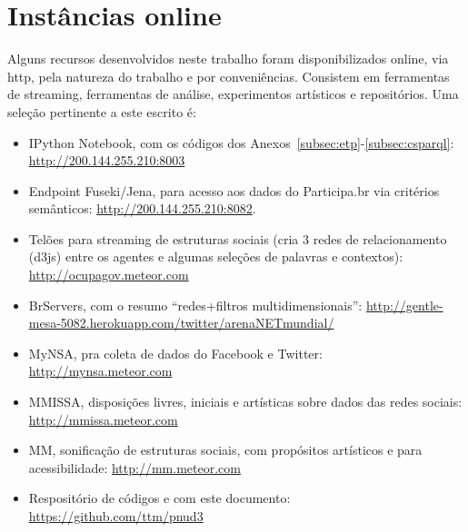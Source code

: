\documentclass[12pt]{article}
\begin{document}
%


\label{subsec:etp}

\label{subsec:srl}

\label{subsec:intAm}
\label{subsec:rkRd}

\label{subsec:setCon}
\label{subsec:com}
\label{subsec:misto}

\label{subsec:csparql}

\section{Instâncias online}\label{subsec:online}
Alguns recursos desenvolvidos neste trabalho foram disponibilizados online, via http, pela natureza do trabalho e por conveniências. Consistem em ferramentas de streaming, ferramentas de análise, experimentos artísticos e repositórios. Uma seleção pertinente a este escrito é:
\begin{itemize}
    \item IPython Notebook, com os códigos dos Anexos~\ref{subsec:etp}-\ref{subsec:csparql}: \url{http://200.144.255.210:8003}
    \item Endpoint Fuseki/Jena, para acesso aos dados do Participa.br via critérios semânticos: \url{http://200.144.255.210:8082}.
    \item Telões para streaming de estruturas sociais (cria 3 redes de relacionamento (d3js) entre os agentes e algumas seleções de palavras e contextos): \url{http://ocupagov.meteor.com}
    \item BrServers, com o resumo ``redes+filtros multidimensionais'': \url{http://gentle-mesa-5082.herokuapp.com/twitter/arenaNETmundial/}
    \item MyNSA, pra coleta de dados do Facebook e Twitter: \url{http://mynsa.meteor.com}
    \item MMISSA, disposições livres, iniciais e artísticas sobre dados das redes sociais: \url{http://mmissa.meteor.com}
    \item MM, sonificação de estruturas sociais, com propósitos artísticos e para acessibilidade: \url{http://mm.meteor.com}
    \item Respositório de códigos e com este documento: \url{https://github.com/ttm/pnud3}
\end{itemize}
\end{document}
